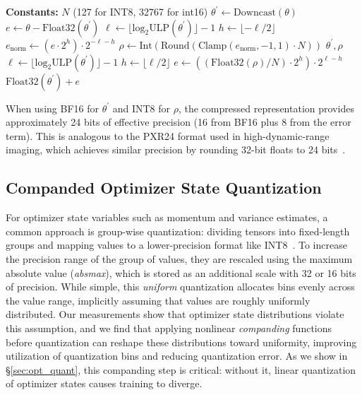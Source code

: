 \documentclass[10pt,twocolumn,letterpaper]{article}
\theoremstyle{plain}
\theoremstyle{definition}
\theoremstyle{remark}
\newcommand{\thetalp}{\theta^\prime}
\begin{document}
\begin{algorithm}[h]
    \caption{Weight Splitting}
    \label{alg:split_reconstruct}
    \begin{algorithmic}[1]
    \Statex \textbf{Constants:} $N$ (127 for INT8, 32767 for int16)
        \State $\thetalp \gets \mathrm{Downcast}(\theta)$
        \State $e \gets \theta - \mathrm{Float32}(\thetalp)$
        \State $\ell \gets \lfloor\mathrm{log_2ULP}(\thetalp)\rfloor - 1$
        \State $h \gets \lfloor -\ell / 2 \rfloor$ 
        \State $e_{\mathrm{norm}} \gets (e \cdot 2^h) \cdot 2^{-\ell - h}$
        \State $\rho \gets \mathrm{Int}(\mathrm{Round}(\mathrm{Clamp}(e_{\mathrm{norm}}, -1, 1) \cdot N))$
        \State \Return $\thetalp, \rho$
    \EndFunction
    \vspace{0.25\baselineskip}
    \Function{$\mathcal{C}^{-1}$}{$\thetalp, \rho$} 
        \State $\ell \gets \lfloor\mathrm{log_2ULP}(\thetalp)\rfloor - 1$
        \State $h \gets \lfloor \ell / 2 \rfloor$
        \State $e \gets ((\mathrm{Float32}(\rho) / N) \cdot 2^h) \cdot 2^{\ell - h}$
        \State \Return $\mathrm{Float32}(\thetalp) + e$
    \EndFunction
    \end{algorithmic}
    \end{algorithm}
    


When using BF16 for $\thetalp$ and INT8 for $\rho$, the compressed representation provides approximately 24 bits of effective precision (16 from BF16 plus 8 from the error term).
This is analogous to the PXR24 format used in high-dynamic-range imaging, which achieves similar precision by rounding 32-bit floats to 24 bits~\citep{kainz2004openexr}.

\subsection{Companded Optimizer State Quantization}
\label{sub:optimizer_state_quantization_with_companding}

For optimizer state variables such as momentum and variance estimates, a common approach is group-wise quantization: dividing tensors into fixed-length groups and mapping values to a lower-precision format like INT8~\citep{dettmers2022optimizers}.
To increase the precision range of the group of values, they are rescaled using the maximum absolute value (\emph{absmax}), which is stored as an additional scale with 32 or 16 bits of precision.
While simple, this \emph{uniform} quantization allocates bins evenly across the value range, implicitly assuming that values are roughly uniformly distributed.
Our measurements show that optimizer state distributions violate this assumption, and we find that applying nonlinear \emph{companding} functions before quantization can reshape these distributions toward uniformity, improving utilization of quantization bins and reducing quantization error.
As we show in \S\ref{sec:opt_quant}, this companding step is critical: without it, linear quantization of optimizer states causes training to diverge.
\end{document}
